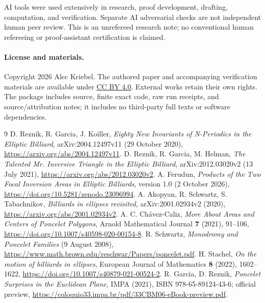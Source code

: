 \documentclass[11pt]{article}
\begin{document}
AI tools were used extensively in research, proof development,
drafting, computation, and verification. Separate AI adversarial checks
are not independent human peer review. This is an unrefereed research
note; no conventional human refereeing or proof-assistant certification
is claimed.

\paragraph{License and materials.}
Copyright 2026 Alec Kriebel. The authored paper and accompanying
verification materials are available under
\href{https://creativecommons.org/licenses/by/4.0/}{CC BY 4.0}.
External works retain their own rights. The package includes source,
finite exact code, raw run receipts, and source/attribution notes;
it includes no third-party full texts or software dependencies.

\begin{thebibliography}{9}
 D. Reznik, R. Garcia, J. Koiller,
\emph{Eighty New Invariants of N-Periodics in the Elliptic Billiard},
arXiv:2004.12497v11 (29 October 2020),
\url{https://arxiv.org/abs/2004.12497v11}.
 D. Reznik, R. Garcia, M. Helman,
\emph{The Talented Mr. Inversive Triangle in the Elliptic Billiard},
arXiv:2012.03020v2 (13 July 2021),
\url{https://arxiv.org/abs/2012.03020v2}.
 A. Ferudun,
\emph{Products of the Two Focal Inversion Areas in Elliptic Billiards},
version 1.0 (2 October 2026),
\url{https://doi.org/10.5281/zenodo.23096994}.
 A. Akopyan, R. Schwartz, S. Tabachnikov,
\emph{Billiards in ellipses revisited}, arXiv:2001.02934v2 (2020),
\url{https://arxiv.org/abs/2001.02934v2}.
 A. C. Ch\'avez-Caliz,
\emph{More About Areas and Centers of Poncelet Polygons},
Arnold Mathematical Journal \textbf{7} (2021), 91--106,
\url{https://doi.org/10.1007/s40598-020-00154-8}.
 R. Schwartz,
\emph{Monodromy and Poncelet Families} (9 August 2008),
\url{https://www.math.brown.edu/reschwar/Papers/poncelet.pdf}.
 H. Stachel,
\emph{On the motion of billiards in ellipses},
European Journal of Mathematics \textbf{8} (2022), 1602--1622,
\url{https://doi.org/10.1007/s40879-021-00524-2}.
 R. Garcia, D. Reznik,
\emph{Poncelet Surprises in the Euclidean Plane}, IMPA (2021),
ISBN 978-65-89124-43-6; official preview,
\url{https://coloquio33.impa.br/pdf/33CBM06-eBook-preview.pdf}.
\end{thebibliography}
\end{document}
